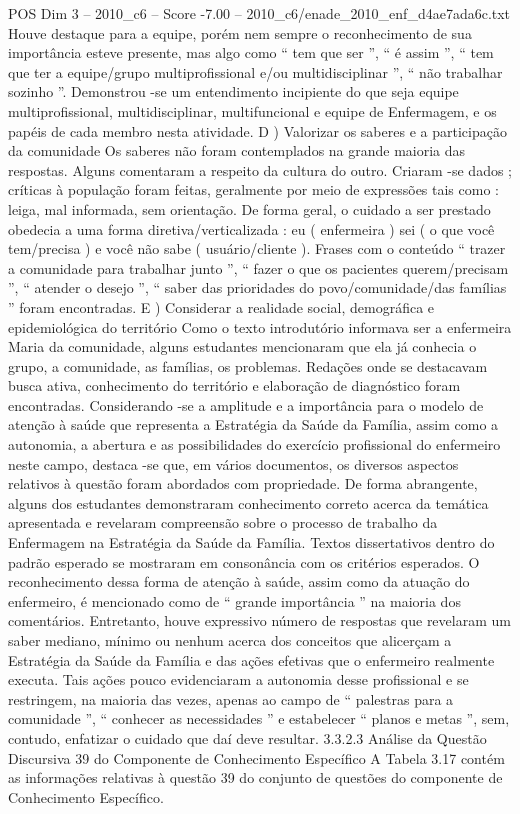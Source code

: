 \begin{textsample}{POS Dim 3 – 2010\_c6 – Score -7.00 – 2010\_c6/enade\_2010\_enf\_d4ae7ada6c.txt}
Houve destaque para a equipe, porém nem sempre o reconhecimento de sua importância esteve presente, mas algo como “ tem que ser ”, “ é assim ”, “ tem que ter a equipe/grupo multiprofissional e/ou multidisciplinar ”, “ não trabalhar sozinho ”.
Demonstrou -se um entendimento incipiente do que seja equipe multiprofissional, multidisciplinar, multifuncional e equipe de Enfermagem, e os papéis de cada membro nesta atividade.
D ) Valorizar os saberes e a participação da comunidade Os saberes não foram contemplados na grande maioria das respostas.
Alguns comentaram a respeito da cultura do outro.
Criaram -se dados ; críticas à população foram feitas, geralmente por meio de expressões tais como : leiga, mal informada, sem orientação.
De forma geral, o cuidado a ser prestado obedecia a uma forma diretiva/verticalizada : eu ( enfermeira ) sei ( o que você tem/precisa ) e você não sabe ( usuário/cliente ).
Frases com o conteúdo “ trazer a comunidade para trabalhar junto ”, “ fazer o que os pacientes querem/precisam ”, “ atender o desejo ”, “ saber das prioridades do povo/comunidade/das famílias ” foram encontradas.
E ) Considerar a realidade social, demográfica e epidemiológica do território Como o texto introdutório informava ser a enfermeira Maria da comunidade, alguns estudantes mencionaram que ela já conhecia o grupo, a comunidade, as famílias, os problemas.
Redações onde se destacavam busca ativa, conhecimento do território e elaboração de diagnóstico foram encontradas.
Considerando -se a amplitude e a importância para o modelo de atenção à saúde que representa a Estratégia da Saúde da Família, assim como a autonomia, a abertura e as possibilidades do exercício profissional do enfermeiro neste campo, destaca -se que, em vários documentos, os diversos aspectos relativos à questão foram abordados com propriedade.
De forma abrangente, alguns dos estudantes demonstraram conhecimento correto acerca da temática apresentada e revelaram compreensão sobre o processo de trabalho da Enfermagem na Estratégia da Saúde da Família.
Textos dissertativos dentro do padrão esperado se mostraram em consonância com os critérios esperados.
O reconhecimento dessa forma de atenção à saúde, assim como da atuação do enfermeiro, é mencionado como de “ grande importância ” na maioria dos comentários.
Entretanto, houve expressivo número de respostas que revelaram um saber mediano, mínimo ou nenhum acerca dos conceitos que alicerçam a Estratégia da Saúde da Família e das ações efetivas que o enfermeiro realmente executa.
Tais ações pouco evidenciaram a autonomia desse profissional e se restringem, na maioria das vezes, apenas ao campo de “ palestras para a comunidade ”, “ conhecer as necessidades ” e estabelecer “ planos e metas ”, sem, contudo, enfatizar o cuidado que daí deve resultar. 3.3.2.3 Análise da Questão Discursiva 39 do Componente de Conhecimento Específico A Tabela 3.17 contém as informações relativas à questão 39 do conjunto de questões do componente de Conhecimento Específico.

\end{textsample}
